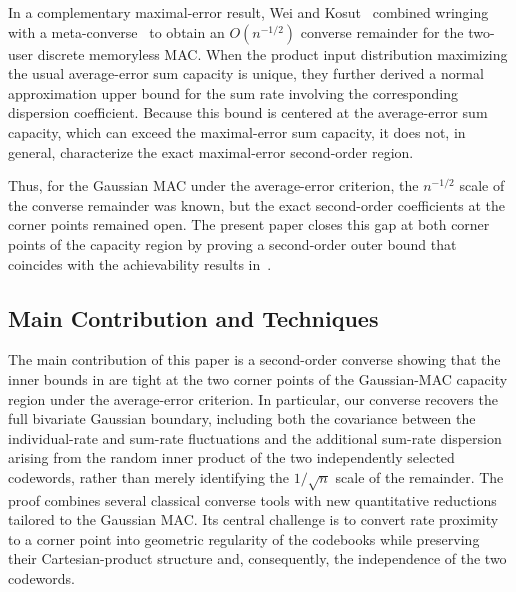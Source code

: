 \documentclass[11pt,onecolumn]{IEEEtran}
\begin{document}
In a complementary maximal-error result, Wei and
Kosut~\cite{WeiKosut2021Wringing} combined wringing with a
meta-converse~\cite{PPV10} to obtain an $O(n^{-1/2})$ converse remainder for
the two-user discrete memoryless MAC. When the product input distribution
maximizing the usual average-error sum capacity is unique, they further
derived a normal approximation upper bound for the sum rate involving the
corresponding dispersion coefficient. Because this bound is centered at the
average-error sum capacity, which can exceed the maximal-error sum capacity,
it does not, in general, characterize the exact maximal-error second-order
region.

Thus, for the Gaussian MAC under the average-error criterion, the
$n^{-1/2}$ scale of the converse remainder was known, but the exact
second-order coefficients at the corner points remained open. The present
paper closes this gap at both corner points of the capacity region by proving a
second-order outer bound that coincides with the achievability results
in~\cite{MolavianJaziLaneman2015,ScarlettMartinezGuillen2015,yavas21}.

\subsection{Main Contribution and Techniques}
The main contribution of this paper is a second-order converse showing that
the inner bounds in
\cite{MolavianJaziLaneman2015,ScarlettMartinezGuillen2015,yavas21}
are tight at the two corner points of the Gaussian-MAC capacity region under
the average-error criterion. In particular, our converse recovers the full bivariate Gaussian boundary, including both the covariance between the individual-rate and sum-rate fluctuations and the additional sum-rate dispersion arising from the random inner product of the two independently selected codewords, rather than merely identifying the $1/\sqrt n$ scale of the remainder. The proof combines several
classical converse tools with new quantitative reductions tailored to the
Gaussian MAC. Its central challenge is to convert rate proximity to a corner
point into geometric regularity of the codebooks while preserving their
Cartesian-product structure and, consequently, the independence of the two
 codewords.
\end{document}
